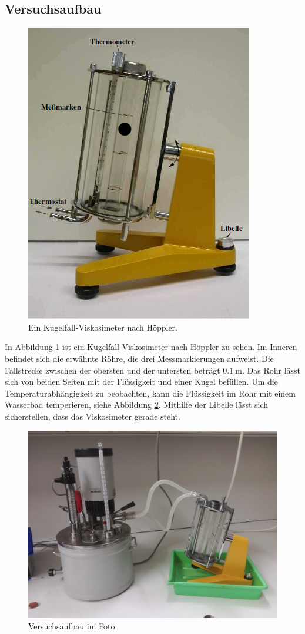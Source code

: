 \subsection{Versuchsaufbau}
\label{sec:3.1}
\begin{figure}
  \centering
  \includegraphics[scale=0.4]{visko.png}
  \caption{Ein Kugelfall-Viskosimeter nach Höppler.}
  \label{fig:1}
\end{figure}
In Abbildung \ref{fig:1} ist ein Kugelfall-Viskosimeter nach Höppler zu sehen.
Im Inneren befindet sich die erwähnte Röhre, die drei Messmarkierungen aufweist.
Die Fallstrecke zwischen der obersten und der untersten beträgt $\SI{0.1}{\meter}$.
Das Rohr lässt sich von beiden Seiten mit der Flüssigkeit und einer Kugel befüllen.
Um die Temperaturabhängigkeit zu beobachten, kann die Flüssigkeit im Rohr mit einem Wasserbad
temperieren, siehe Abbildung \ref{fig:2}. Mithilfe der Libelle lässt sich sicherstellen,
dass das Viskosimeter gerade steht.
\begin{figure}
  \centering
  \includegraphics[scale=0.05]{aufbau.jpg}
  \caption{Versuchsaufbau im Foto.}
  \label{fig:2}
\end{figure}
